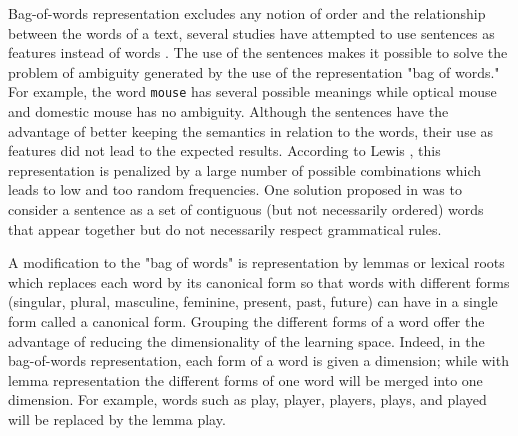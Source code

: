 
Bag-of-words representation excludes any notion of order and
the relationship between the words of a text, several studies have
attempted to use sentences as features instead of words \citep{fuhr1991probabilistic} \citep{tzeras1993automatic}.
The use of the sentences makes it possible to solve the problem of
ambiguity generated by the use of the representation "bag of words." For
example, the word \texttt{mouse} has several possible meanings while
optical mouse and domestic mouse has no ambiguity. Although the
sentences have the advantage of better keeping the semantics in relation
to the words, their use as features did not lead to the expected
results. According to Lewis \citep{lewis1992representation}, this representation is penalized
by a large number of possible combinations which leads to low and too
random frequencies. One solution proposed in \citep{caropreso2001learner} was to consider a
sentence as a set of contiguous (but not necessarily ordered) words that
appear together but do not necessarily respect grammatical rules.


A modification to the "bag of words" is representation by lemmas or lexical roots which replaces  each word by its canonical form so that words with different
forms (singular, plural, masculine, feminine, present, past,
future) can have in a single form called a canonical form.
Grouping the different forms of a word offer the advantage of reducing the dimensionality of the learning space. Indeed, in the bag-of-words representation, each form of a word is given a dimension; while with lemma representation the different forms of one word will be merged into one dimension. For example, words such as play, player, players, plays, and played will be replaced by the lemma play.


